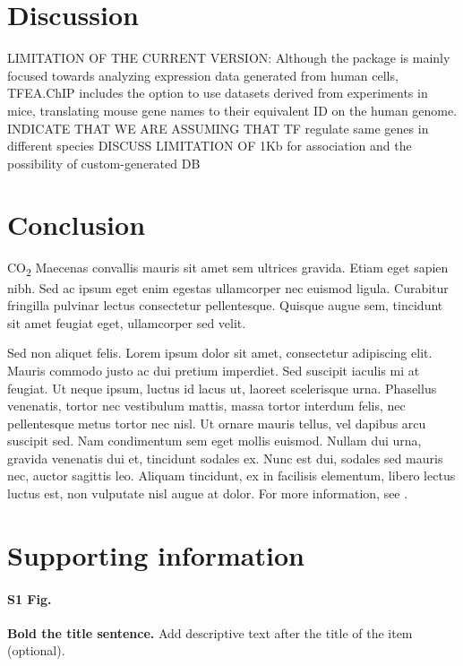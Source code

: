 \documentclass[10pt,letterpaper]{article}
\begin{document}
\section*{Discussion}
LIMITATION OF THE CURRENT VERSION: Although the package is mainly focused towards analyzing expression data generated from human cells, TFEA.ChIP includes the option to use datasets derived from experiments in mice, translating mouse gene names to their equivalent ID on the human genome. INDICATE THAT WE ARE ASSUMING THAT TF regulate same genes in different species
DISCUSS LIMITATION OF 1Kb for association and the possibility of custom-generated DB

\section*{Conclusion}

CO\textsubscript{2} Maecenas convallis mauris sit amet sem ultrices gravida. Etiam eget sapien nibh. Sed ac ipsum eget enim egestas ullamcorper nec euismod ligula. Curabitur fringilla pulvinar lectus consectetur pellentesque. Quisque augue sem, tincidunt sit amet feugiat eget, ullamcorper sed velit. 

Sed non aliquet felis. Lorem ipsum dolor sit amet, consectetur adipiscing elit. Mauris commodo justo ac dui pretium imperdiet. Sed suscipit iaculis mi at feugiat. Ut neque ipsum, luctus id lacus ut, laoreet scelerisque urna. Phasellus venenatis, tortor nec vestibulum mattis, massa tortor interdum felis, nec pellentesque metus tortor nec nisl. Ut ornare mauris tellus, vel dapibus arcu suscipit sed. Nam condimentum sem eget mollis euismod. Nullam dui urna, gravida venenatis dui et, tincidunt sodales ex. Nunc est dui, sodales sed mauris nec, auctor sagittis leo. Aliquam tincidunt, ex in facilisis elementum, libero lectus luctus est, non vulputate nisl augue at dolor. For more information, see .

\section*{Supporting information}

\paragraph*{S1 Fig.}
\label{S1_Fig}
{\bf Bold the title sentence.} Add descriptive text after the title of the item (optional).
\end{document}
